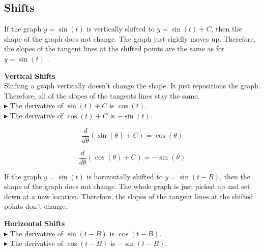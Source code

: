 \documentclass{ximera}
\begin{document}
\subsection{Shifts}




If the graph $y = \sin(t)$ is vertically shifted to $y = \sin(t)+C$, then the shape of the graph does not change. The graph just rigidly moves up. Therefore, the slopes of the tangent lines at the shifted points are the same as for $y = \sin(t)$ .



\begin{observation} \textbf{\textcolor{purple!85!blue}{Vertical Shifts}}  \\

Shifting a graph vertically doesn't change the shape.  It just repositions the graph.  Therefore, all of the slopes of the tangents lines stay the same. \\



$\blacktriangleright$ The derivative of $\sin(t)+C$ is $\cos(t)$. \\

$\blacktriangleright$ The derivative of $\cos(t)+C$ is $-\sin(t)$. \\

\end{observation}


\begin{notation}

\[
\frac{d}{d\theta} (\sin(\theta) + C) = \cos(\theta)
\]

\[
\frac{d}{d\theta} (\cos(\theta) + C) = -\sin(\theta)
\]

\end{notation}


If the graph $y = \sin(t)$ is horizontally shifted to $y = \sin(t - B)$, then the shape of the graph does not change. The whole graph is just picked up and set down at a new location. Therefore, the slopes of the tangent lines at the shifted points don't change.



\begin{observation} \textbf{\textcolor{purple!85!blue}{Horizontal Shifts}} \\

$\blacktriangleright$ The derivative of $\sin(t - B)$ is $\cos(t - B)$. \\

$\blacktriangleright$ The derivative of $\cos(t - B)$ is $-\sin(t - B)$. \\

\end{observation}
\end{document}
